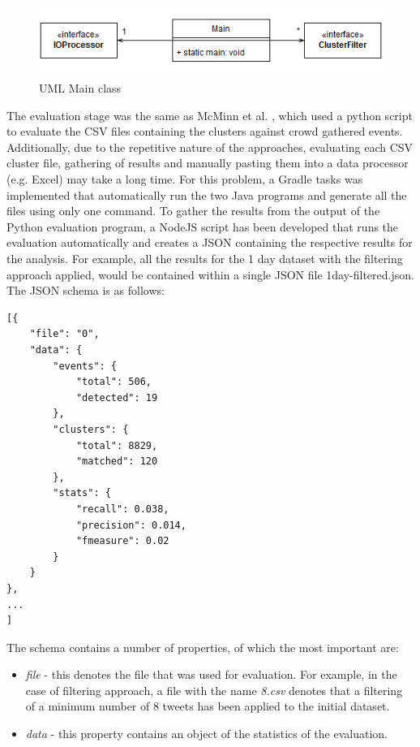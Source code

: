 \documentclass[a4paper,portrait,12pt]{article}
\begin{document}
\begin{figure}[h!]
	\centering
	\includegraphics[width=0.7\linewidth]{images/mainUML.png}
	\caption{UML Main class}
	\label{fig:mainUML}
\end{figure}

The evaluation stage was the same as McMinn et al. \cite{McMinn2013}, which used a python script to evaluate the CSV files containing the clusters against crowd gathered events.
Additionally, due to the repetitive nature of the approaches, evaluating each CSV cluster file, gathering of results and manually pasting them into a data processor (e.g. Excel) may take a long time.
For this problem, a Gradle tasks was implemented that automatically run the two Java programs and generate all the files using only one command.
To gather the results from the output of the Python evaluation program, a NodeJS script has been developed that runs the evaluation automatically and creates a JSON containing the respective results for the analysis.
For example, all the results for the 1 day dataset with the filtering approach applied, would be contained within a single JSON file 1day-filtered.json.
The JSON schema is as follows:

\begin{lstlisting}[caption=JSON Schema Example, label=json-schema]
[{
    "file": "0",
    "data": {
        "events": {
            "total": 506,
            "detected": 19
        },
        "clusters": {
            "total": 8829,
            "matched": 120
        },
        "stats": {
            "recall": 0.038,
            "precision": 0.014,
            "fmeasure": 0.02
        }
    }
},
...
]
\end{lstlisting}

The schema contains a number of properties, of which the most important are:
\begin{itemize}
	\item \textit{file} - this denotes the file that was used for evaluation.
	      For example, in the case of filtering approach, a file with the name \textit{8.csv} denotes that a filtering of a minimum number of 8 tweets has been applied to the initial dataset.
	\item \textit{data} - this property contains an object of the statistics of the evaluation.
\end{itemize}
\end{document}
